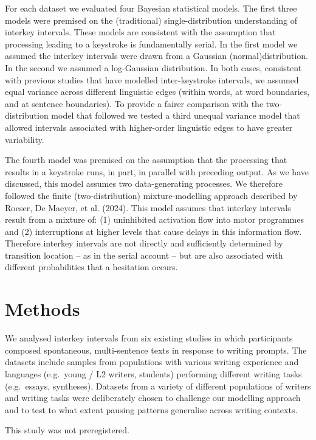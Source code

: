 \documentclass[
  man,floatsintext]{apa7}
\begin{document}
For each dataset we evaluated four Bayesian statistical models. The first three models were premised on the (traditional) single-distribution understanding of interkey intervals. These models are consistent with the assumption that processing leading to a keystroke is fundamentally serial. In the first model we assumed the interkey intervals were drawn from a Gaussian (normal)distribution. In the second we assumed a log-Gaussian distribution. In both cases, consistent with previous studies that have modelled inter-keystroke intervals, we assumed equal variance across different linguistic edges (within words, at word boundaries, and at sentence boundaries). To provide a fairer comparison with the two-distribution model that followed we tested a third unequal variance model that allowed intervals associated with higher-order linguistic edges to have greater variability.

The fourth model was premised on the assumption that the processing that results in a keystroke runs, in part, in parallel with preceding output. As we have discussed, this model assumes two data-generating processes. We therefore followed the finite (two-distribution) mixture-modelling approach described by Roeser, De Maeyer, et al. (2024). This model assumes that interkey intervals result from a mixture of: (1) uninhibited activation flow into motor programmes and (2) interruptions at higher levels that cause delays in this information flow. Therefore interkey intervals are not directly and sufficiently determined by transition location -- as in the serial account -- but are also associated with different probabilities that a hesitation occurs.

\hypertarget{methods}{%
\section{Methods}\label{methods}}

We analysed interkey intervals from six existing studies in which participants composed spontaneous, multi-sentence texts in response to writing prompts. The datasets include samples from populations with various writing experience and languages (e.g.~young / L2 writers, students) performing different writing tasks (e.g.~essays, syntheses). Datasets from a variety of different populations of writers and writing tasks were deliberately chosen to challenge our modelling approach and to test to what extent pausing patterns generalise across writing contexts.

This study was not preregistered.
\end{document}
